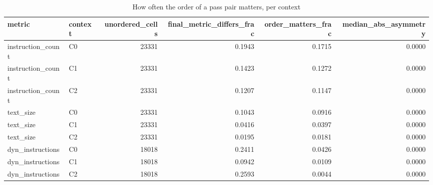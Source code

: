 \begin{table}[t]
\centering
\caption{How often the order of a pass pair matters, per context}
\label{tab:rq1-order-dependence}
\begin{tabular}{llrrrr}
\toprule
metric & context & unordered\_cells & final\_metric\_differs\_frac & order\_matters\_frac & median\_abs\_asymmetry \\
\midrule
instruction\_count & C0 & 23331 & 0.1943 & 0.1715 & 0.0000 \\
instruction\_count & C1 & 23331 & 0.1423 & 0.1272 & 0.0000 \\
instruction\_count & C2 & 23331 & 0.1207 & 0.1147 & 0.0000 \\
text\_size & C0 & 23331 & 0.1043 & 0.0916 & 0.0000 \\
text\_size & C1 & 23331 & 0.0416 & 0.0397 & 0.0000 \\
text\_size & C2 & 23331 & 0.0195 & 0.0181 & 0.0000 \\
dyn\_instructions & C0 & 18018 & 0.2411 & 0.0426 & 0.0000 \\
dyn\_instructions & C1 & 18018 & 0.0942 & 0.0109 & 0.0000 \\
dyn\_instructions & C2 & 18018 & 0.2593 & 0.0044 & 0.0000 \\
\bottomrule
\end{tabular}
\end{table}
